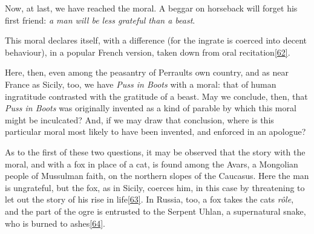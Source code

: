 \documentclass[14pt,a4paper]{memoir}
\begin{document}
Now, at last, we have reached the moral. A beggar on horseback will
forget his first friend: \emph{a man will be less grateful than a
beast}.

This moral declares itself, with a difference (for the ingrate is
coerced into decent behaviour), in a popular French version, taken down
from oral
recitation\protect\hypertarget{4533318093929944247_33931-h-0.htm.xhtmlux5cux23FNanchor_62}{}{}\protect\hyperlink{4533318093929944247_33931-h-1.htm.xhtmlux5cux23Footnote_62}{{[}62{]}}.

Here, then, even among the peasantry of Perrault\textquotesingle s own
country, and as near France as Sicily, too, we have \emph{Puss in Boots}
with a moral: that of human ingratitude contrasted with the gratitude of
a beast. May we conclude, then, that \emph{Puss in Boots} was originally
invented as a kind of parable by which this moral might be inculcated?
And, if we may draw that conclusion, where is this particular moral most
likely to have been invented, and enforced in an apologue?

As to the first of these two questions, it may be observed that the
story with the moral, and with a fox in place of a cat, is found among
the Avars, a Mongolian people of Mussulman faith, on the northern slopes
of the Caucasus. Here the man is ungrateful, but the fox, as in Sicily,
coerces him, in this case by threatening to let out the story of his
rise in
life\protect\hypertarget{4533318093929944247_33931-h-0.htm.xhtmlux5cux23FNanchor_63}{}{}\protect\hyperlink{4533318093929944247_33931-h-1.htm.xhtmlux5cux23Footnote_63}{{[}63{]}}.
In Russia, too, a fox takes the cat\textquotesingle s \emph{rôle}, and
the part of the ogre is entrusted to the Serpent Uhlan, a supernatural
snake, who is burned to
ashes\protect\hypertarget{4533318093929944247_33931-h-0.htm.xhtmlux5cux23FNanchor_64}{}{}\protect\hyperlink{4533318093929944247_33931-h-1.htm.xhtmlux5cux23Footnote_64}{{[}64{]}}.
\end{document}
